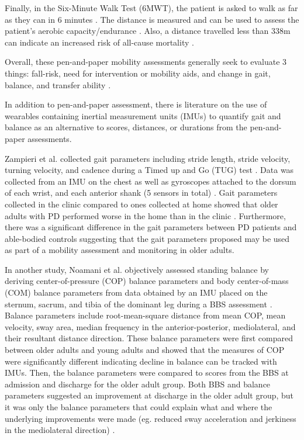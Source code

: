 Finally, in the Six-Minute Walk Test (6MWT), the patient is asked to walk as far as they can in 6 minutes 
\cite{avers_functional_2020,enright_six-minute_2003}. The distance is measured and can be used to assess the patient’s aerobic capacity/endurance \cite{avers_functional_2020}. 
Also, a distance travelled less than 338m can indicate an increased risk of all-cause mortality \cite{avers_functional_2020}. 

Overall, these pen-and-paper mobility assessments generally seek to evaluate 3 things: fall-risk, 
need for intervention or mobility aids, and change in gait, balance, and transfer ability \cite{soubra_systematic_2019,avers_functional_2020}.

In addition to pen-and-paper assessment, there is literature on the use of wearables containing 
inertial measurement units (IMUs) to quantify gait and balance as an alternative to scores, distances, 
or durations from the pen-and-paper assessments.

Zampieri et al. collected gait parameters including stride length, stride velocity, turning velocity, 
and cadence during a Timed up and Go (TUG) test \cite{zampieri_assessing_2011}. Data was collected from an IMU on the chest as well 
as gyroscopes attached to the dorsum of each wrist, and each anterior shank (5 sensors in total) \cite{zampieri_assessing_2011}. 
Gait parameters collected in the clinic compared to ones collected at home showed that older adults 
with PD performed worse in the home than in the clinic \cite{zampieri_assessing_2011}. Furthermore, there was a significant 
difference in the gait parameters between PD patients and able-bodied controls \cite{zampieri_assessing_2011} suggesting that 
the gait parameters proposed may be used as part of a mobility assessment and monitoring in older adults. 

In another study, Noamani et al. objectively assessed standing balance by deriving center-of-pressure 
(COP) balance parameters \cite{prieto_measures_1996} and body center-of-mass (COM) balance parameters \cite{mancini_isway_2012} from data obtained 
by an IMU placed on the sternum, sacrum, and tibia of the dominant leg during a BBS assessment \cite{noamani_instrumented_2022}. 
Balance parameters include root-mean-square distance from mean COP, mean velocity, sway area, median 
frequency in the anterior-posterior, mediolateral, and their resultant distance direction. These balance 
parameters were first compared between older adults and young adults and showed that the measures of COP 
were significantly different \cite{noamani_instrumented_2022} indicating decline in balance can be tracked with IMUs. Then, the 
balance parameters were compared to scores from the BBS at admission and discharge for the older adult group. 
Both BBS and balance parameters suggested an improvement at discharge in the older adult group, but it was 
only the balance parameters that could explain what and where the underlying improvements were made 
(eg. reduced sway acceleration and jerkiness in the mediolateral direction) \cite{noamani_instrumented_2022}. 

